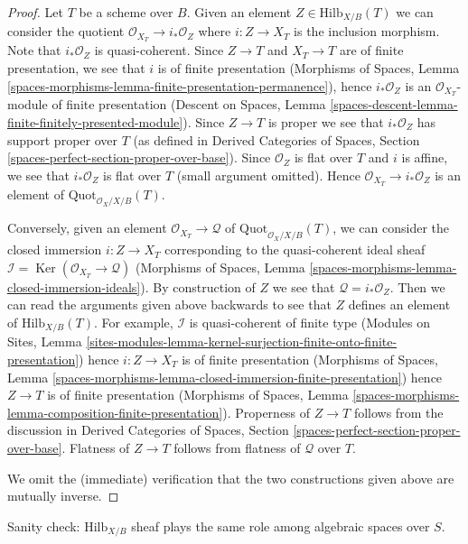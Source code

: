 \documentclass{stacks-project}
\theoremstyle{plain}
\theoremstyle{definition}
\theoremstyle{remark}
\numberwithin{equation}{subsection}
\def\Ker{\mathop{\mathrm{Ker}}}
\def\Quotfunctor{\mathrm{Quot}}
\def\Hilbfunctor{\mathrm{Hilb}}
\begin{document}
\begin{proof}
Let $T$ be a scheme over $B$. Given an element
$Z \in \Hilbfunctor_{X/B}(T)$ we can consider the
quotient $\mathcal{O}_{X_T} \to i_*\mathcal{O}_Z$
where $i : Z \to X_T$ is the inclusion morphism.
Note that $i_*\mathcal{O}_Z$ is quasi-coherent.
Since $Z \to T$ and $X_T \to T$ are of finite presentation,
we see that $i$ is of finite presentation (Morphisms of Spaces, Lemma
\ref{spaces-morphisms-lemma-finite-presentation-permanence}), hence
$i_*\mathcal{O}_Z$ is an $\mathcal{O}_{X_T}$-module of
finite presentation (Descent on Spaces, Lemma
\ref{spaces-descent-lemma-finite-finitely-presented-module}).
Since $Z \to T$ is proper we see that $i_*\mathcal{O}_Z$
has support proper over $T$ (as defined in
Derived Categories of Spaces, Section
\ref{spaces-perfect-section-proper-over-base}).
Since $\mathcal{O}_Z$ is flat
over $T$ and $i$ is affine, we see that $i_*\mathcal{O}_Z$
is flat over $T$ (small argument omitted). Hence
$\mathcal{O}_{X_T} \to i_*\mathcal{O}_Z$
is an element of $\Quotfunctor_{\mathcal{O}_X/X/B}(T)$.

\medskip\noindent
Conversely, given an element $\mathcal{O}_{X_T} \to \mathcal{Q}$
of $\Quotfunctor_{\mathcal{O}_X/X/B}(T)$, we can consider
the closed immersion $i : Z \to X_T$ corresponding to
the quasi-coherent ideal sheaf
$\mathcal{I} = \Ker(\mathcal{O}_{X_T} \to \mathcal{Q})$
(Morphisms of Spaces, Lemma
\ref{spaces-morphisms-lemma-closed-immersion-ideals}).
By construction of $Z$ we see that $\mathcal{Q} = i_*\mathcal{O}_Z$.
Then we can read the arguments given above backwards to see
that $Z$ defines an element of $\Hilbfunctor_{X/B}(T)$.
For example, $\mathcal{I}$ is quasi-coherent of finite type
(Modules on Sites, Lemma
\ref{sites-modules-lemma-kernel-surjection-finite-onto-finite-presentation})
hence $i : Z \to X_T$ is of finite presentation
(Morphisms of Spaces, Lemma
\ref{spaces-morphisms-lemma-closed-immersion-finite-presentation})
hence $Z \to T$ is of finite presentation
(Morphisms of Spaces, Lemma
\ref{spaces-morphisms-lemma-composition-finite-presentation}).
Properness of $Z \to T$ follows from the discussion in
Derived Categories of Spaces, Section
\ref{spaces-perfect-section-proper-over-base}.
Flatness of $Z \to T$ follows from flatness of $\mathcal{Q}$ over $T$.

\medskip\noindent
We omit the (immediate) verification that the two constructions given
above are mutually inverse.
\end{proof}

\noindent
Sanity check: $\Hilbfunctor_{X/B}$
sheaf plays the same role among algebraic spaces over $S$.
\end{document}
